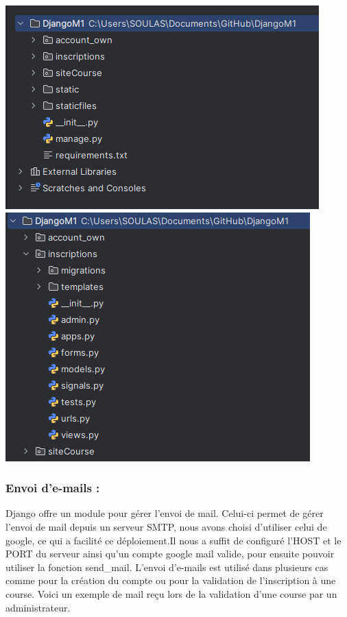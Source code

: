 \documentclass[12pt]{article} %
\begin{document}
            \includegraphics[scale=0.6]{images/Capture_structure.PNG}
            \includegraphics[scale=0.6]{images/Capture_structure-inscription.PNG}

        \subsubsection{Envoi d’e-mails :}
            Django offre un module pour gérer l'envoi de mail. Celui-ci permet de gérer l'envoi de mail depuis un serveur SMTP, nous avons choisi d'utiliser celui de google, ce qui a facilité ce déploiement.Il nous a suffit de configuré l'HOST et le PORT du serveur ainsi qu'un compte google mail valide, pour ensuite pouvoir utiliser la fonction send\_mail.
            L’envoi d’e-mails est utilisé dans plusieurs cas comme pour la création du compte ou pour la validation de l’inscription à une course. Voici un exemple de mail reçu lors de la validation d'une course par un administrateur.
    
\end{document}
